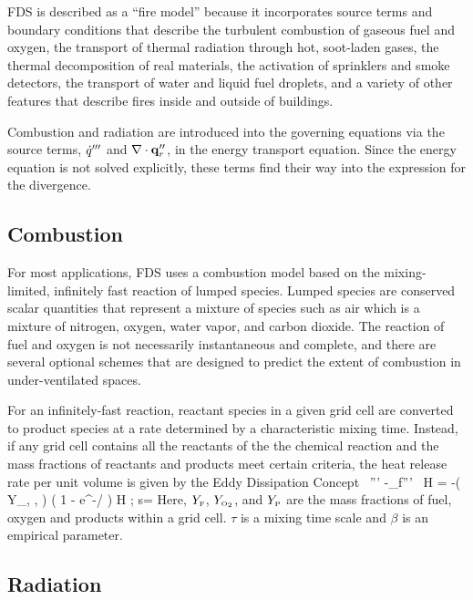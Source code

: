 FDS is described as a ``fire model'' because it incorporates source terms and boundary conditions that describe the
turbulent combustion of gaseous fuel and oxygen, the transport of thermal radiation through hot, soot-laden gases, the
thermal decomposition of real materials, the activation of sprinklers and smoke detectors, the transport of water and liquid fuel
droplets, and a variety of other features that describe fires inside and outside of buildings.

Combustion and radiation are introduced into the governing equations via the source terms, $\dot{q}'''$ and $\nabla \cdot {\bf q}_r''$,
in the energy transport equation. Since the energy equation is not solved explicitly, these terms find their way into the
expression for the divergence.

\subsection{Combustion}

For most applications, FDS uses a combustion model based on the mixing-limited, infinitely fast reaction of lumped species.
Lumped species are conserved scalar quantities that represent a mixture of species such as air which is a mixture of
nitrogen, oxygen, water vapor, and carbon dioxide.  The reaction of fuel and oxygen is not necessarily instantaneous and
complete, and there are
several optional schemes that are designed to predict the extent of combustion in under-ventilated spaces.

For an infinitely-fast reaction, reactant species in a given grid cell are converted to product species at a rate determined by a
characteristic mixing time.
Instead, if any grid cell contains all the reactants of the the chemical reaction and the mass fractions of reactants and products meet certain criteria, the heat release rate per unit volume is given by the Eddy Dissipation Concept~\cite{Poinsot:TNC}
\be
   \dq''' \equiv -\dm_f''' \, \Delta H = -\rho \min \left( Y_\F , , \beta {} \right) \;
   \left( 1 - e^{-\dt/\tau} \right)  \; \Delta H \quad ; \quad
   s=  \label{EDC1}
\ee  %
Here, $Y_{\tiny \hbox{F}}$, $Y_{\tiny \hbox{O}_2}$, and $Y_{\hbox{\tiny P}}$ are the mass fractions of fuel, oxygen and products within a grid cell.
$\tau$ is a mixing time scale and $\beta$ is an empirical parameter.


\subsection{Radiation}


